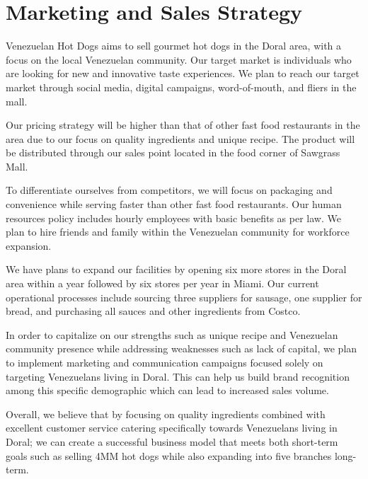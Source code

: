 \section{Marketing and Sales Strategy}\label{sec:marketing}

Venezuelan Hot Dogs aims to sell gourmet hot dogs in the Doral area, with a focus on the local Venezuelan community. Our target market is individuals who are looking for new and innovative taste experiences. We plan to reach our target market through social media, digital campaigns, word-of-mouth, and fliers in the mall.

Our pricing strategy will be higher than that of other fast food restaurants in the area due to our focus on quality ingredients and unique recipe. The product will be distributed through our sales point located in the food corner of Sawgrass Mall.

To differentiate ourselves from competitors, we will focus on packaging and convenience while serving faster than other fast food restaurants. Our human resources policy includes hourly employees with basic benefits as per law. We plan to hire friends and family within the Venezuelan community for workforce expansion.

We have plans to expand our facilities by opening six more stores in the Doral area within a year followed by six stores per year in Miami. Our current operational processes include sourcing three suppliers for sausage, one supplier for bread, and purchasing all sauces and other ingredients from Costco.

In order to capitalize on our strengths such as unique recipe and Venezuelan community presence while addressing weaknesses such as lack of capital, we plan to implement marketing and communication campaigns focused solely on targeting Venezuelans living in Doral. This can help us build brand recognition among this specific demographic which can lead to increased sales volume.

Overall, we believe that by focusing on quality ingredients combined with excellent customer service catering specifically towards Venezuelans living in Doral; we can create a successful business model that meets both short-term goals such as selling 4MM hot dogs while also expanding into five branches long-term.